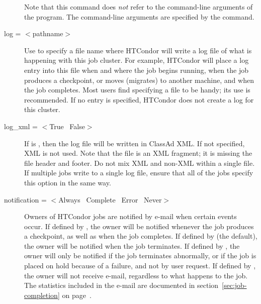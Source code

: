 \begin{description}
Note that this command does \emph{not} refer to the command-line
arguments of the program.  The command-line arguments are specified by
the  command.


\label{man-condor-submit-log}
\item[log = $<$pathname$>$] 
Use  to specify a file name where
HTCondor will write a log file of what is happening with this job cluster.
For example, HTCondor will place a log entry into this file
when and where the job begins running,
when the job produces a checkpoint, or moves (migrates) to another machine,
and when the job completes.
Most users find specifying a  file to be handy;
its use is recommended. If no  entry is specified, 
HTCondor does not create a log for this cluster.


\label{man-condor-submit-log-xml}
\item[log\_xml = $<$True \Bar\ False$>$]
If  is , 
then the log file will be written in ClassAd XML.
If not specified, XML is not used.
Note that the file is an XML fragment; it is
missing the file header and footer.
Do not mix XML and non-XML within a single file.
If multiple jobs write to a
single log file, ensure that all of the jobs specify
this option in the same way.


\label{man-condor-submit-notification}
\item[notification = $<$Always \Bar\ Complete \Bar\ Error \Bar\ Never$>$]
Owners of HTCondor jobs are notified by
e-mail when certain events occur.
If defined by , the owner will be notified
whenever the job produces a checkpoint, as well as when the job completes.
If defined by  (the default), the owner will
be notified when the job terminates.
If defined by , the owner will only be notified
if the job terminates abnormally,
or if the job is placed on hold because of a failure, and not by user request.
If defined by , the owner will not receive e-mail,
regardless to what happens to the job.
The statistics included in the e-mail are documented in
section~\ref{sec:job-completion} on
page~\pageref{sec:job-completion}.


\end{description}
